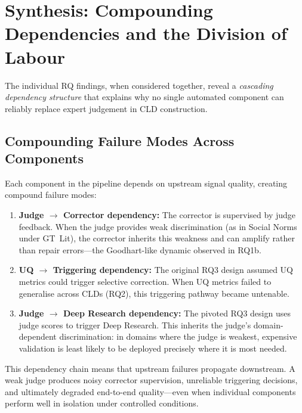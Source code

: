 \section{Synthesis: Compounding Dependencies and the Division of Labour}
\label{sec:discussion_synthesis}

The individual RQ findings, when considered together, reveal a \emph{cascading dependency structure} that explains why no single automated component can reliably replace expert judgement in CLD construction.

\subsection{Compounding Failure Modes Across Components}

Each component in the pipeline depends on upstream signal quality, creating compound failure modes:

\begin{enumerate}[noitemsep]
    \item \textbf{Judge $\rightarrow$ Corrector dependency:} The corrector is supervised by judge feedback. When the judge provides weak discrimination (as in Social Norms under GT~Lit), the corrector inherits this weakness and can amplify rather than repair errors---the Goodhart-like dynamic observed in RQ1b.
    
    \item \textbf{UQ $\rightarrow$ Triggering dependency:} The original RQ3 design assumed UQ metrics could trigger selective correction. When UQ metrics failed to generalise across CLDs (RQ2), this triggering pathway became untenable.
    
    \item \textbf{Judge $\rightarrow$ Deep Research dependency:} The pivoted RQ3 design uses judge scores to trigger Deep Research. This inherits the judge's domain-dependent discrimination: in domains where the judge is weakest, expensive validation is least likely to be deployed precisely where it is most needed.
\end{enumerate}

This dependency chain means that upstream failures propagate downstream. A weak judge produces noisy corrector supervision, unreliable triggering decisions, and ultimately degraded end-to-end quality---even when individual components perform well in isolation under controlled conditions.

